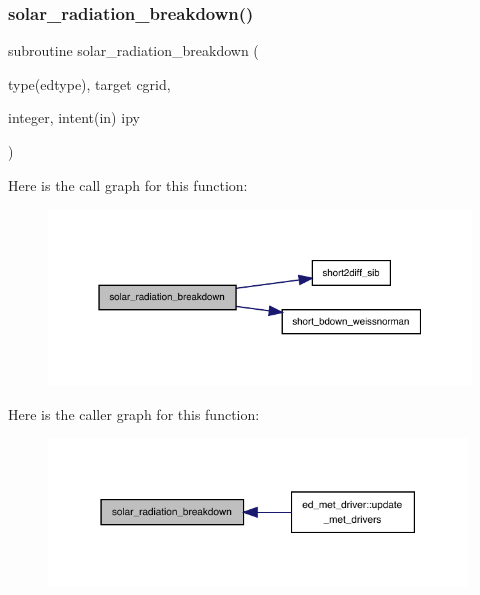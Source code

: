\subsubsection{\texorpdfstring{solar\+\_\+radiation\+\_\+breakdown()}{solar\_radiation\_breakdown()}}
{\footnotesize\ttfamily subroutine solar\+\_\+radiation\+\_\+breakdown (\begin{DoxyParamCaption}\item[{type(edtype), target}]{cgrid,  }\item[{integer, intent(in)}]{ipy }\end{DoxyParamCaption})}

Here is the call graph for this function\+:
\nopagebreak
\begin{figure}[H]
\begin{center}
\leavevmode
\includegraphics[width=331pt]{radiate__utils_8f90_a672952348e79808e2b0f947194522dce_cgraph}
\end{center}
\end{figure}
Here is the caller graph for this function\+:
\nopagebreak
\begin{figure}[H]
\begin{center}
\leavevmode
\includegraphics[width=315pt]{radiate__utils_8f90_a672952348e79808e2b0f947194522dce_icgraph}
\end{center}
\end{figure}
\mbox{\label{radiate__utils_8f90_a08249d25775527a48b4647e648d4b711}} 
